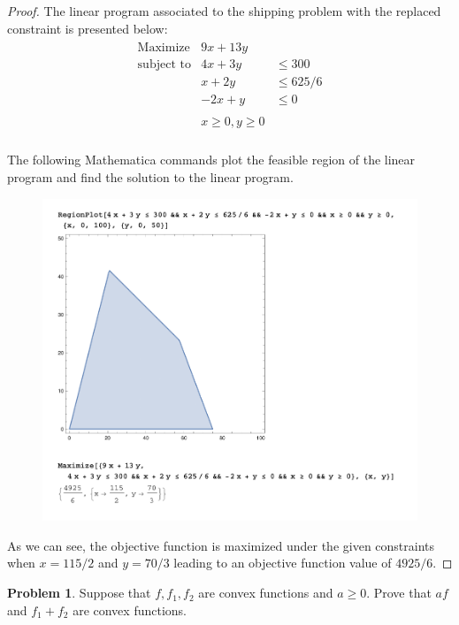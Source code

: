 \documentclass[12pt]{article}
\theoremstyle{definition}
\newtheorem{problem}{Problem}
\begin{document}
\begin{proof}
  The linear program associated to the shipping problem with the replaced constraint
  is presented below:
  \begin{align*}
    \begin{array} {lll}
      \text{Maximize} & 9x + 13y & \\
      \text{subject to} & 4x + 3y &\leq 300 \\
      & x + 2y &\leq 625/6\\
      & -2x + y &\leq 0 \\ \\
      & x \geq 0, y \geq 0 & \\
    \end{array}
  \end{align*}

  The following Mathematica commands plot the feasible region of the linear
  program and find the solution to the linear program.
  \begin{figure}[!h]
    \centerline{\includegraphics[scale=0.9]{linear_program}}
  \end{figure}

  As we can see, the objective function is maximized under the given constraints
  when $x = 115/2$ and $y = 70/3$ leading to an objective function value of $4925/6$.
\end{proof}
\newpage


\begin{problem}
  Suppose that $f, f_1, f_2$ are convex functions and $a \geq 0$. Prove that
  $af$ and $f_1 + f_2$ are convex functions.
\end{problem}
\end{document}
